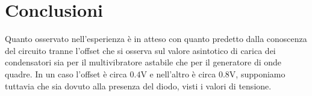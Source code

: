 \documentclass[10pt,a4paper]{article}
\begin{document}
\section{Conclusioni}

Quanto osservato nell'esperienza è in atteso con quanto predetto dalla conoscenza del circuito tranne l'offset che si osserva sul valore asintotico di carica dei condensatori sia per il multivibratore astabile che per il generatore di onde quadre. In un caso l'offset è circa $0.4$V e nell'altro è circa $0.8$V, supponiamo tuttavia che sia dovuto alla presenza del diodo, visti i valori di tensione.\\
\end{document}
